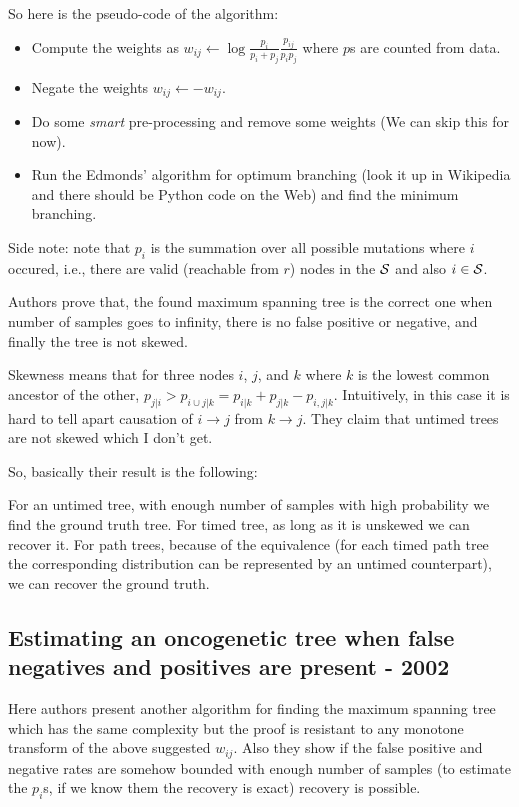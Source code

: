 \documentclass[]{article}
\begin{document}
	So here is the pseudo-code of the algorithm:
	\begin{itemize}
		\item Compute the weights as $w_{ij} \leftarrow \log \frac{p_i}{p_i + p_j} \frac{p_{ij}}{p_i p_j}$ where $p$s are counted from data. 
		\item Negate the weights $w_{ij}  \leftarrow -w_{ij} $. 
		\item Do some \emph{smart} pre-processing and remove some weights (We can skip this for now). 
		\item Run the Edmonds' algorithm for optimum branching (look it up in Wikipedia and there should be Python code on the Web) and find the minimum branching. 
	\end{itemize}
	
	Side note: note that $p_i$ is the summation over all possible mutations where $i$ occured, i.e., there are valid (reachable from $r$) nodes in the ${\cal S}$ and also $i \in {\cal S}$. 
	
	Authors prove that, the found maximum spanning tree is the correct one when number of samples goes to infinity, there is no false positive or negative, and finally the tree is not skewed. 
	
	Skewness means that for three nodes $i$, $j$, and $k$ where $k$ is the lowest common ancestor of the other, $p_{j|i} > p_{i\cup j|k} = p_{i|k} + p_{j|k} - p_{i, j|k}$. 
	Intuitively, in this case it is hard to tell apart causation of $i\rightarrow j$ from $k\rightarrow j$. 
	They claim that untimed trees are not skewed which I don't get. 
	
	So, basically their result is the following:
	
	For an untimed tree, with enough number of samples with high probability we find the ground truth tree. 
	For timed tree, as long as it is unskewed we can recover it. 
	For path trees, because of the equivalence (for each timed path tree the corresponding distribution can be represented by an untimed counterpart), we can recover the ground truth. 
	
	
	
	
	\subsection{Estimating an oncogenetic tree when false negatives and positives are present - 2002}
	
	Here authors present another algorithm for finding the maximum spanning tree which has the same complexity but the proof is resistant to any monotone transform of the above suggested $w_{ij}$. 
	Also they show if the false positive and negative rates are somehow bounded with enough number of samples (to estimate the $p_i$s, if we know them the recovery is exact) recovery is possible. 
	
\end{document}
